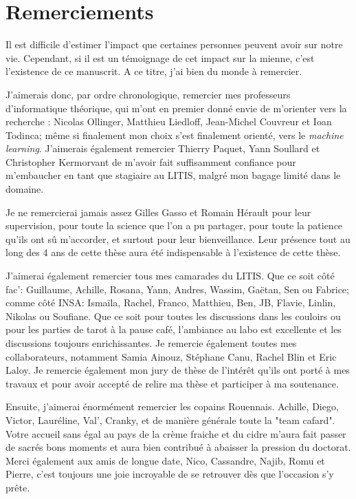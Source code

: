 \chapter*{Remerciements}
\label{chap:remerciements}

Il est difficile d'estimer l'impact que certaines personnes peuvent avoir sur notre vie. Cependant, si il est un témoignage de cet impact sur la mienne, c'est l'existence de ce manuscrit. A ce titre, j'ai bien du monde à remercier.

J'aimerais donc, par ordre chronologique, remercier mes professeurs d'informatique théorique, qui m'ont en premier donné envie de m'orienter vers la recherche : Nicolas Ollinger, Matthieu Liedloff, Jean-Michel Couvreur et Ioan Todinca; même si finalement mon choix s'est finalement orienté, vers le \textit{machine learning}. J'aimerais également remercier Thierry Paquet, Yann Soullard et Christopher Kermorvant de m'avoir fait suffisamment confiance pour m'embaucher en tant que stagiaire au LITIS, malgré mon bagage limité dans le domaine.

Je ne remercierai jamais assez Gilles Gasso et Romain Hérault pour leur supervision, pour toute la science que l'on a pu partager, pour toute la patience qu'ils ont sû m'accorder, et surtout pour leur bienveillance. Leur présence tout au long des 4 ans de cette thèse aura été indispensable à l'existence de cette thèse.

J'aimerai également remercier tous mes camarades du LITIS. Que ce soit côté fac': Guillaume, Achille, Rosana, Yann, Andres, Wassim, Gaëtan, Sen ou Fabrice; comme côté INSA: Ismaïla, Rachel,  Franco, Matthieu, Ben, JB, Flavie, Linlin, Nikolas ou Soufiane. Que ce soit pour toutes les discussions dans les couloirs ou pour les parties de tarot à la pause café, l'ambiance au labo est excellente et les discussions toujours enrichissantes. Je remercie également toutes mes collaborateurs, notamment Samia Ainouz, Stéphane Canu, Rachel Blin et Eric Laloy. Je remercie également mon jury de thèse de l'intérêt qu'ils ont porté à mes travaux et pour avoir accepté de relire ma thèse et participer à ma soutenance.

Ensuite, j'aimerai énormément remercier les copains Rouennais. Achille, Diego, Victor, Lauréline, Val', Cranky, et de manière générale toute la "team cafard". Votre accueil sans égal au pays de la crème fraiche et du cidre m'aura fait passer de sacrés bons moments et aura bien contribué à abaisser la pression du doctorat.  Merci également aux amis de longue date, Nico, Cassandre, Najib, Romu et Pierre, c'est toujours une joie incroyable de se retrouver dès que l'occasion s'y prête.

